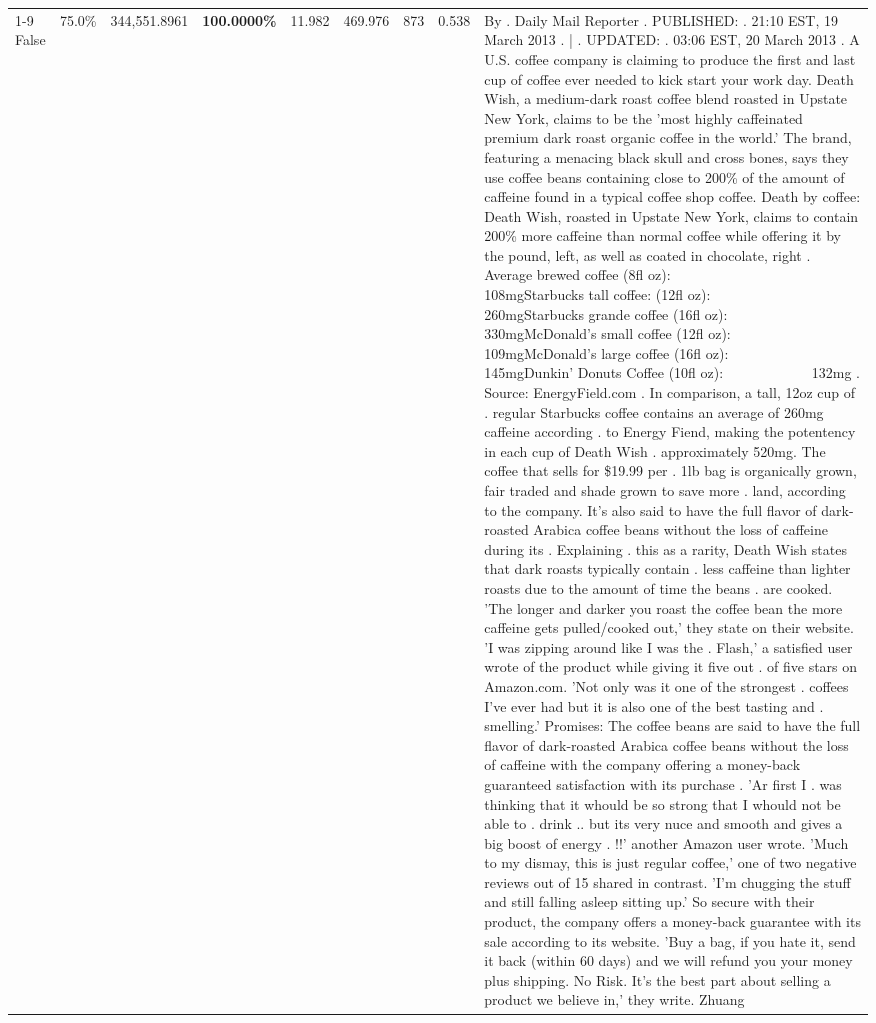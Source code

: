 \begin{table}[H]
{\begin{tabular}{lllrlllll}
\cline{1-9}
False & 75.0\% & 344,551.8961 & \bfseries \color{red} 100.0000\% & 11.982 & 469.976 & 873 & 0.538 & By . Daily Mail Reporter . PUBLISHED: . 21:10 EST, 19 March 2013 . | . UPDATED: . 03:06 EST, 20 March 2013 . A U.S. coffee company is claiming to produce the first and last cup of coffee ever needed to kick start your work day. Death Wish, a medium-dark roast coffee blend roasted in Upstate New York, claims to be the 'most highly caffeinated premium dark roast organic coffee in the world.' The brand, featuring a menacing black skull and cross bones, says they use coffee beans containing close to 200\% of the amount of caffeine found in a typical coffee shop coffee. Death by coffee: Death Wish, roasted in Upstate New York, claims to contain 200\% more caffeine than normal coffee while offering it by the pound, left, as well as coated in chocolate, right . Average brewed coffee (8fl oz):              108mgStarbucks tall coffee: (12fl oz):                260mgStarbucks grande coffee (16fl oz):         330mgMcDonald's small coffee (12fl oz):           109mgMcDonald's large coffee (16fl oz):           145mgDunkin' Donuts Coffee (10fl oz):             132mg . Source: EnergyField.com . In comparison, a tall, 12oz cup of . regular Starbucks coffee contains an average of 260mg caffeine according . to Energy Fiend, making the potentency in each cup of Death Wish . approximately 520mg. The coffee that sells for \$19.99 per . 1lb bag is organically grown, fair traded and shade grown to save more . land, according to the company. It's also said to have the full flavor of dark-roasted Arabica coffee beans without the loss of caffeine during its . Explaining . this as a rarity, Death Wish states that dark roasts typically contain . less caffeine than lighter roasts due to the amount of time the beans . are cooked. 'The longer and darker you roast the coffee bean the more caffeine gets pulled/cooked out,' they state on their website. 'I was zipping around like I was the . Flash,' a satisfied user wrote of the product while giving it five out . of five stars on Amazon.com. 'Not only was it one of the strongest . coffees I've ever had but it is also one of the best tasting and . smelling.’ Promises: The coffee beans are said to have the full flavor of dark-roasted Arabica coffee beans without the loss of caffeine with the company offering a money-back guaranteed satisfaction with its purchase . 'Ar first I . was thinking that it whould be so strong that I whould not be able to . drink .. but its very nuce and smooth and gives a big boost of energy . !!' another Amazon user wrote. 'Much to my dismay, this is just regular coffee,' one of two negative reviews out of 15 shared in contrast. 'I'm chugging the stuff and still falling asleep sitting up.' So secure with their product, the company offers a money-back guarantee with its sale according to its website. 'Buy a bag, if you hate it, send it back (within 60 days) and we will refund you your money plus shipping. No Risk. It’s the best part about selling a product we believe in,' they write. Zhuang \\

\end{tabular}}
\end{table}
